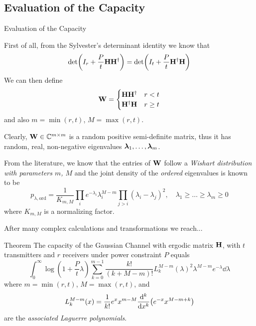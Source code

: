 \subsection{Evaluation of the Capacity}
\begin{frame}[allowframebreaks]{Evaluation of the Capacity}

First of all, from the Sylvester's determinant identity we know that
$$\det(I_r + \frac{P}{t}\vb{H\ensuremath{H^\dagger}}) = \det(I_t + \frac{P}{t}\vb{\ensuremath{H^\dagger}H})$$
We can then define
\begin{equation*}
\vb{W}=\begin{cases}
\vb{H\ensuremath{H^\dagger}}	& r<t\\
\vb{\ensuremath{H^\dagger}H}	& r\geq t
\end{cases}
\end{equation*}
and also $m=\min(r,t)$, $M=\max(r,t)$.

\medskip
Clearly, $\vb{W}\in \mathbb{C}^{m\times m}$ is a random positive semi-definite matrix, thus it has random, real, non-negative eigenvalues $\vb*{\lambda}_1,\ldots,\vb*{\lambda}_m$.

\framebreak

From the literature, we know that the entries of $\vb{W}$ follow a \textit{Wishart distribution with parameters $m$, $M$} and the joint density of the \textit{ordered} eigenvalues is known to be \cite{james1964}
$$p_{\lambda,\text{ord}} = 	\frac{1}{K_{m,M}}
\prod_i e^{-\lambda_i}\lambda_i^{M-m}
\prod_{j>i} (\lambda_i-\lambda_j)^2,
\quad \lambda_1\geq \ldots \geq \lambda_m \geq 0 $$
where $K_{m,M}$ is a normalizing factor.

\medskip
After many complex calculations and transformations we reach...

\framebreak

\begin{alertblock}{Theorem}
	The capacity of the Gaussian Channel with ergodic matrix $\vb{H}$, with $t$ transmitters and $r$ receivers under power constraint $P$ equals
	\begin{equation}\label{eq:capacity_ergodic}
	\int_0^\infty \log(1+\frac{P}{t}\lambda)
	\sum_{k=0}^{m-1} \frac{k!}{(k+M-m)!}
	L_k^{M-m}(\lambda)^2
	\lambda^{M-m} e^{-\lambda}
	\dd{\lambda}
	\end{equation}
	where $m=\min(r,t)$, $M=\max(r,t)$, and
	$$L_k^{M-m}(x) = \frac{1}{k!}
	e^x x^{m-M}
	\dv[k]{}{x}
	\qty(e^{-x}x^{M-m+k})$$
	are the \textit{associated Laguerre polynomials}.
\end{alertblock}

\end{frame}

